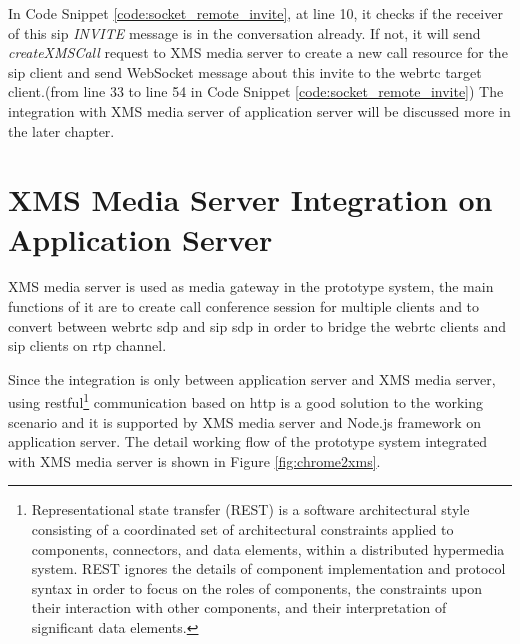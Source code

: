 \par In Code Snippet \ref{code:socket_remote_invite}, at line 10, it checks if the receiver of this \gls{sip} \textit{INVITE} message is in the conversation already. If not, it will send \textit{createXMSCall} request to XMS media server to create a new call resource for the \gls{sip} client and send WebSocket message about this invite to the \gls{webrtc} target client.(from line 33 to line 54 in Code Snippet \ref{code:socket_remote_invite}) The integration with XMS media server of application server will be discussed more in the later chapter.

\section{XMS Media Server Integration on Application Server}

\noindent XMS media server is used as media gateway in the prototype system, the main functions of it are to create call conference session for multiple clients and to convert between \gls{webrtc} \gls{sdp} and \gls{sip} \gls{sdp} in order to bridge the \gls{webrtc} clients and \gls{sip} clients on \gls{rtp} channel.

\par Since the integration is only between application server and XMS media server, using \gls{rest}ful\footnote{Representational state transfer (REST) is a software architectural style consisting of a coordinated set of architectural constraints applied to components, connectors, and data elements, within a distributed hypermedia system. REST ignores the details of component implementation and protocol syntax in order to focus on the roles of components, the constraints upon their interaction with other components, and their interpretation of significant data elements.\cite{wiki:restful}} communication based on \gls{http} is a good solution to the working scenario and it is supported by XMS media server and Node.js framework on application server. The detail working flow of the prototype system integrated with XMS media server is shown in Figure \ref{fig:chrome2xms}.

